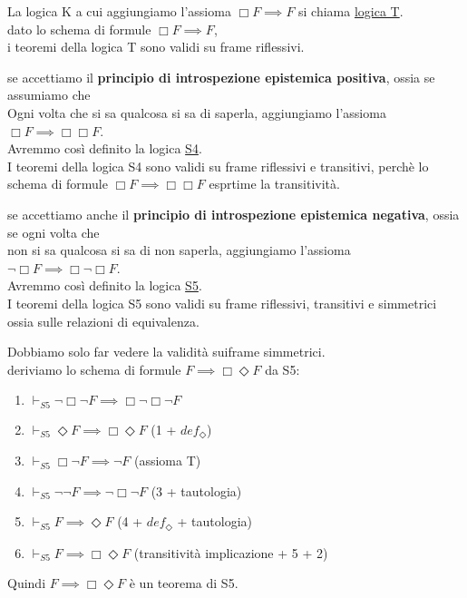 \documentclass[a4paper,12pt]{article}
\theoremstyle{def}
\theoremstyle{prop}
\theoremstyle{esempio}
\theoremstyle{dimostrazione}
\theoremstyle{teo}
\theoremstyle{osservazione}
\begin{document}
\begin{list}{-}{}
	\item La logica K a cui aggiungiamo l'assioma \(\Box F \implies F\) si chiama \underline{logica T}.\\
			dato lo schema di formule \(\Box F \implies F\),\\
			i teoremi della logica T sono validi su frame riflessivi.
	\item se accettiamo il \textbf{principio di introspezione epistemica positiva}, ossia se assumiamo che\\
			Ogni volta che si sa qualcosa si sa di saperla, aggiungiamo l'assioma \(\Box F \implies \Box \Box F\).\\
			Avremmo così definito la logica \underline{S4}.\\
			I teoremi della logica S4 sono validi su frame riflessivi e transitivi, perchè lo schema di formule \(\Box F \implies \Box \Box F\) esprtime la transitività.
	\item se accettiamo anche il \textbf{principio di introspezione epistemica negativa}, ossia se ogni volta che\\
			non si sa qualcosa si sa di non saperla, aggiungiamo l'assioma \(\neg \Box F \implies \Box \neg \Box F\).\\
			Avremmo così definito la logica \underline{S5}.\\
			I teoremi della logica S5 sono validi su frame riflessivi, transitivi e simmetrici ossia sulle relazioni di equivalenza.
\end{list}
Dobbiamo solo far vedere la validità suiframe simmetrici.\\
deriviamo lo schema di formule \(F \implies \Box \Diamond F\) da S5:
\begin{enumerate}
	\item \(\vdash_{S5} \neg \Box \neg F \implies \Box \neg \Box \neg F\)
	\item \(\vdash_{S5} \Diamond F \implies \Box \Diamond F\) (1 + \(def_\Diamond\))
	\item \(\vdash_{S5} \Box \neg F \implies \neg F\) (assioma T)
	\item \(\vdash_{S5} \neg \neg F \implies \neg \Box \neg F\) (3 + tautologia)
	\item \(\vdash_{S5} F \implies \Diamond F\) (4 + \(def_\Diamond\) + tautologia)
	\item \(\vdash_{S5} F \implies \Box \Diamond F\) (transitività implicazione + 5 + 2)
\end{enumerate}
Quindi \(F \implies \Box \Diamond F\) è un teorema di S5.\\
\end{document}
